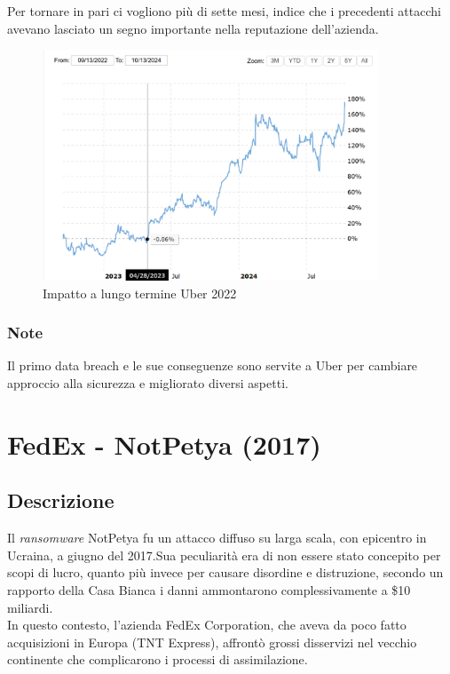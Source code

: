 \documentclass[12pt,a4paper,openright,twoside]{report}
\begin{document}
Per tornare in pari ci vogliono pi\`u di sette mesi, indice che i precedenti attacchi avevano lasciato un segno importante nella reputazione dell'azienda.\\

\begin{figure}[H] 
\begin{center} 
\includegraphics[width=10cm]{figures/uber_2022_long.png} 
\caption[Grafico Uber 2022 long]{Impatto a lungo termine Uber 2022}\label{fig:ubr2}
\end{center}
\end{figure}

\subsubsection{Note}
Il primo data breach e le sue conseguenze sono servite a Uber per cambiare approccio alla sicurezza e migliorato diversi aspetti\cite{Uber_2022}.

\section{FedEx - NotPetya (2017)}
\subsection{Descrizione}
Il \textit{ransomware} NotPetya fu un attacco diffuso su larga scala, con epicentro in Ucraina, a giugno del 2017.Sua  peculiarit\`a era di non essere stato concepito per scopi di lucro, quanto pi\`u invece per causare disordine e distruzione\cite{FedEx_evolutionOfRansom}, secondo un rapporto della Casa Bianca i danni ammontarono complessivamente a \$10 miliardi\cite{FedEx_wired}.\\
In questo contesto, l'azienda FedEx Corporation, che aveva da poco fatto acquisizioni in Europa (TNT Express), affront\`o grossi disservizi nel vecchio continente che complicarono i processi di assimilazione\cite{FedEx_10K_report_2018}.\\
\end{document}
